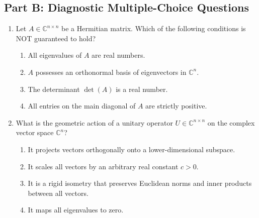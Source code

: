 \subsection*{Part B: Diagnostic Multiple-Choice Questions}

\begin{enumerate}[label=\textbf{MCQ\arabic*.}]
    \item Let $A \in \mathbb{C}^{n \times n}$ be a Hermitian matrix. Which of the following conditions is NOT guaranteed to hold?
    \begin{enumerate}[label=(\alph*)]
        \item All eigenvalues of $A$ are real numbers.
        \item $A$ possesses an orthonormal basis of eigenvectors in $\mathbb{C}^n$.
        \item The determinant $\det(A)$ is a real number.
        \item All entries on the main diagonal of $A$ are strictly positive.
    \end{enumerate}

    \item What is the geometric action of a unitary operator $U \in \mathbb{C}^{n \times n}$ on the complex vector space $\mathbb{C}^n$?
    \begin{enumerate}[label=(\alph*)]
        \item It projects vectors orthogonally onto a lower-dimensional subspace.
        \item It scales all vectors by an arbitrary real constant $c > 0$.
        \item It is a rigid isometry that preserves Euclidean norms and inner products between all vectors.
        \item It maps all eigenvalues to zero.
    \end{enumerate}
\end{enumerate}
